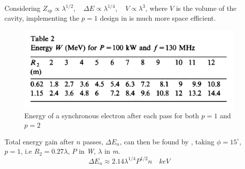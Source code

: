\documentclass{article}
\begin{document}
Considering $Z_{sp} \propto \lambda^{1/2}$, \,\,\, $\Delta E \propto \lambda^{1/4}$, \,\,\,   $V \propto \lambda^3$, where $V$ is the volume of the cavity, implementing the $p=1$ design in  is much more space efficient.
\begin{figure}[H]
    \centering
    \includegraphics[width=.9\textwidth]{../../../figures/pottier_table2.png}
    \caption{Energy of a synchronous electron after each pass for both $p=1$ and $p=2$ \cite{rhodo_pottier}}
    \label{fig:pottier_table2}
\end{figure}
Total energy gain after $n$ passes, $\Delta E_n$, can then be found by , taking $\phi = 15^\circ$, $p=1$, i.e $R_2 = 0.27 \lambda$, $P$ in \textit{W}, $\lambda$ in \textit{m}.
\begin{equation}
    \label{eq:W_total_gain_pottier}
    \Delta E_n \approx 2.14 \lambda^{1/4} P^{1/2} n \quad keV
\end{equation}
\end{document}
